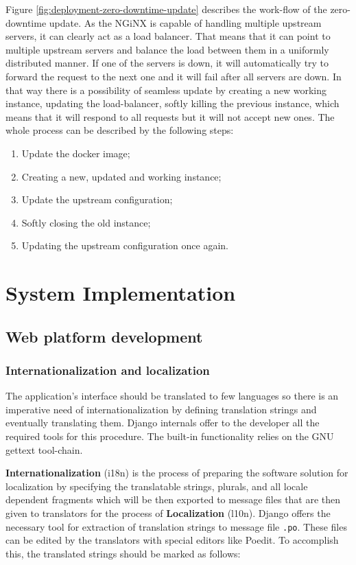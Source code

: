 \documentclass[12pt,oneside,a4paper]{article}
\begin{document}
Figure \ref{fig:deployment-zero-downtime-update} describes the work-flow of the zero-downtime update. As the NGiNX is capable of handling multiple upstream servers, it can clearly act as a load balancer. That means that it can point to multiple upstream servers and balance the load between them in a uniformly distributed manner. If one of the servers is down, it will automatically try to forward the request to the next one and it will fail after all servers are down. In that way there is a possibility of seamless update by creating a new working instance, updating the load-balancer, softly killing the previous instance, which means that it will respond to all requests but it will not accept new ones. The whole process can be described by the following steps:
\begin{enumerate}
  \item Update the docker image;
  \item Creating a new, updated and working instance;
  \item Update the upstream configuration;
  \item Softly closing the old instance;
  \item Updating the upstream configuration once again.
\end{enumerate}

\newpage
\section{System Implementation}
\subsection{Web platform development}
\subsubsection{Internationalization and localization}
The application's interface should be translated to few languages so there is an imperative need of internationalization by defining translation strings and eventually translating them. Django internals offer to the developer all the required tools for this procedure. The built-in functionality relies on the GNU gettext tool-chain.

\textbf{Internationalization} (i18n) is the process of preparing the software solution for localization by specifying the translatable strings, plurals, and all locale dependent fragments which will be then exported to message files that are then given to translators for the process of \textbf{Localization} (l10n). Django offers the necessary tool for extraction of translation strings to message file \texttt{.po}. These files can be edited by the translators with special editors like Poedit. To accomplish this, the translated strings should be marked as follows:
\inputminted[linenos,baselinestretch=1,xleftmargin=0.5cm]{python}{src/i18n-1.py}
\end{document}
